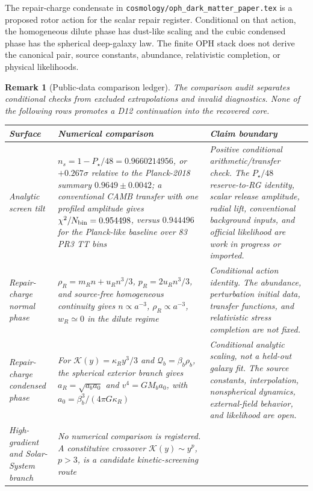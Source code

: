 \documentclass[11pt]{article}
\newtheorem{remark}[theorem]{Remark}
\begin{document}
The repair-charge condensate in
\texttt{cosmology/oph\_dark\_matter\_paper.tex} is a proposed rotor action for
the scalar repair register. Conditional on that action, the homogeneous dilute
phase has dust-like scaling and the cubic condensed phase has the spherical
deep-galaxy law. The finite OPH stack does not derive the canonical pair,
source constants, abundance, relativistic completion, or physical likelihoods.

\begin{remark}[Public-data comparison ledger]\label{rem:round-one-cosmology-ledger}
The comparison audit separates conditional checks from excluded extrapolations
and invalid diagnostics.  None of the following
rows promotes a D12 continuation into the recovered core.
\begin{center}
\small
\begin{tabular}{@{}>{\raggedright\arraybackslash}p{}>{\raggedright\arraybackslash}p{}>{\raggedright\arraybackslash}p{}@{}}
\toprule
Surface & Numerical comparison & Claim boundary \\
\midrule
Analytic screen tilt &
\(n_s=1-P_\star/48=0.9660214956\), or \(+0.267\sigma\) relative to the Planck-2018 summary \(0.9649\pm0.0042\); a conventional CAMB transfer with one profiled amplitude gives \(\chi^2/N_{\rm bin}=0.954498\), versus \(0.944496\) for the Planck-like baseline over 83 PR3 TT bins &
Positive conditional arithmetic/transfer check.  The \(P_\star/48\) reserve-to-RG identity, scalar release amplitude, radial lift, conventional background inputs, and official likelihood are work in progress or imported.\\
Repair-charge normal phase &
\(\rho_R=m_Rn+u_Rn^3/3\), \(p_R=2u_Rn^3/3\), and source-free homogeneous continuity gives \(n\propto a^{-3}\), \(\rho_R\propto a^{-3}\), \(w_R\simeq0\) in the dilute regime &
Conditional action identity. The abundance, perturbation initial data, transfer functions, and relativistic stress completion are not fixed.\\
Repair-charge condensed phase &
For \(\mathcal K(y)=\kappa_Ry^3/3\) and \(\mathcal Q_b=\beta_b\rho_b\), the spherical exterior branch gives \(a_R=\sqrt{a_ba_0}\) and \(v^4=GM_ba_0\), with \(a_0=\beta_b^3/(4\pi G\kappa_R)\) &
Conditional analytic scaling, not a held-out galaxy fit. The source constants, interpolation, nonspherical dynamics, external-field behavior, and likelihood are open.\\
High-gradient and Solar-System branch &
No numerical comparison is registered. A constitutive crossover \(\mathcal K(y)\sim y^p\), \(p>3\), is a candidate kinetic-screening route &

\end{tabular}
\end{center}
\end{remark}
\end{document}
